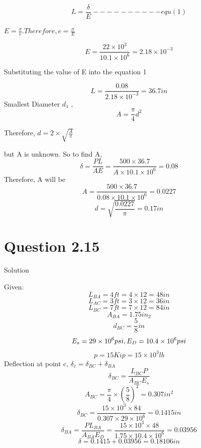 \documentclass{article}
\begin{document}
\[L = \frac{\delta}{E} ----------equ(1)\]
\begin{center} $E =\frac{\sigma}{e}. Therefore, e = \frac{\sigma}{E}$\end{center}
\[E = \frac{22 \times10^{3}}{10.1\times10^{6}} = 2.18\times 10^{-3}\]
\begin{center}Substituting the value of E into the equation 1\end{center}
\[L = \frac{0.08}{2.18\times10^{-3}}=36.7in\]
Smallest Diameter $d_{1}$ ,
\[A = \frac{\pi}{4}d^{2}\]
\begin{center} Therefore, $d = 2 \times \sqrt{\frac{A}{\pi}}$\end{center}
but A is unknown. So to find A, 
\[\delta = \frac{PL}{AE} = \frac{500 \times 36.7}{A \times 10.1\times10^{6}} = 0.08\]
Therefore, A will be
\[A = \frac{500\times36.7}{0.08\times10.1\times10^{6}} = 0.0227\]
\[d = \sqrt{\frac{0.0227}{\pi}} = 0.17in\]

\section*{Question 2.15}
\begin{center} Solution\end{center}
Given:
\[ L_{BA} = 4ft = 4 \times 12 = 48in\]
\[ L_{AC} = 3ft = 3 \times 12 = 36in\]
\[ L_{BC} = 7ft = 7 \times 12 = 84in\]
\[ A_{BA} =  1.75in_{2}\]
\[d_{BC} = \frac{5}{8}in\]
\[ E_{s} = 29 \times 10^{6}psi, \space E_{D} = 10.4 \times 10^{6}psi\]
\[p = 15Kip = 15\times 10^{3}lb\]
Deflection at point c, $\delta_{c} = \delta_{BC} + \delta_{BA}$
\[\delta_{BC} = \frac{L_{BC}P}{A_{BC}E_{s}} \]
\[A_{BC} = \frac{\pi}{4} \times {(\frac{5}{8})^{2}} = 0.307in^{2}\]
\[\delta_{BC} = \frac{15 \times 10^{3}\times 84}{0.307 \times 29 \times 10^{6}} = 0.1415in\]
\[\delta_{BA} = \frac{PL_{BA}}{A_{BA}E_{D}} = \frac{15 \times 10^{3}\times48}{1.75\times10.4\times10^{6} }= 0.03956\]
\[\delta = 0.1415 + 0.03956 = 0.18106in\]

\end{document}
